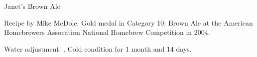 \begin{recipe}{Janet's Brown Ale}

\begin{aboutblock}
Recipe by Mike McDole. Gold medal in Category 10: Brown Ale at the American
Homebrewers Assocation National Homebrew Competition in 2004.
\sourceaha
\end{aboutblock}


\begin{methodandtiming}

\begin{mashsteps}
\end{mashsteps}

\begin{fermentationsteps}
\end{fermentationsteps}

\begin{directions}
Water adjustment: . Cold condition for 1 month
and 14 days.
\end{directions}

\end{methodandtiming}

\recipebreak

\begin{ingredientsblock}

\begin{malts}
\end{malts}

\begin{hops}
\end{hops}


\end{ingredientsblock}

\end{recipe}

